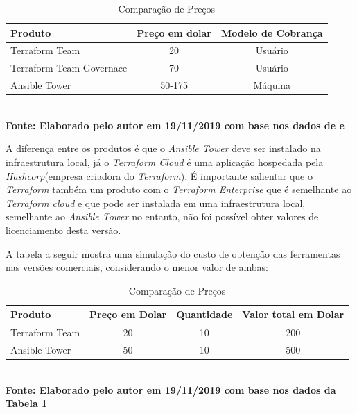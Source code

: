    \begin{table}[ht]
	\centering
	\caption{\hspace{0.1cm} Comparação de Preços}
	\vspace{-0.3cm} %
	\label{tab:tabela4}
	\begin{tabular}{l|c|c}
  \hline
    \textbf{Produto}	& \textbf{Preço em dolar} & \textbf{Modelo de Cobrança} \\
    \hline
  Terraform Team & 20  & Usuário\\
  Terraform Team-Governace  & 70 &   Usuário  \\
  Ansible Tower  & 50-175 &   Máquina  \\
     \hline
 \end{tabular}
 	\vspace{.1cm}  %
	\small
	{\footnotesize\\ \textbf{Fonte: Elaborado pelo autor em 19/11/2019 com base nos dados de \textit{\cite{opensource.io}} e  \textit{\cite{hashcorp3}}}}
\end{table}

A diferença entre os produtos é que o \textit{Ansible Tower} deve ser instalado na infraestrutura local, já o \textit{Terraform Cloud} é uma aplicação hospedada pela \textit{Hashcorp}(empresa criadora do \textit{Terraform}). É importante salientar que o \textit{Terraform} também um produto com o \textit{Terraform Enterprise} que é semelhante ao \textit{Terraform cloud} e  que pode ser instalada em uma infraestrutura local, semelhante ao \textit{Ansible Tower} no entanto, não foi possível obter valores de licenciamento desta versão.  


A tabela a seguir mostra uma simulação  do custo de obtenção das ferramentas nas versões comerciais, considerando o menor valor de ambas:


   \begin{table}[ht]
	\centering
	\caption{\hspace{0.1cm} Comparação de Preços}
	\vspace{-0.3cm} %
	\label{tab:tabela5}
	\begin{tabular}{l|c|c|c}
  \hline
    \textbf{Produto} & \textbf{Preço em Dolar} & \textbf{Quantidade}  & \textbf{Valor total em Dolar} \\
    \hline
  Terraform Team & 20  & 10 & 200\\
  Ansible Tower  & 50 & 10 & 500\\
     \hline
 \end{tabular}
 	\vspace{.1cm}  %
	\small
	{\footnotesize\\ \textbf{Fonte: Elaborado pelo autor em 19/11/2019 com base nos dados da Tabela \ref{tab:tabela4}}}
\end{table}

